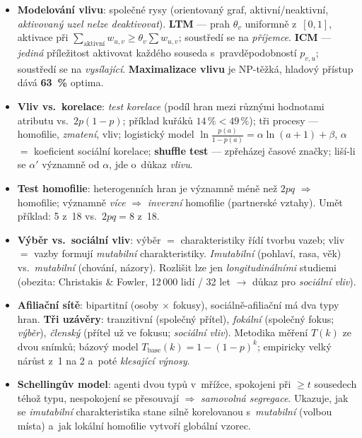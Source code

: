 \documentclass[11pt,a4paper]{article}
\theoremstyle{definition}
\begin{document}
\begin{itemize}
\item \textbf{Modelování vlivu}: společné rysy (orientovaný graf, aktivní/neaktivní,
      \emph{aktivovaný uzel nelze deaktivovat}). \textbf{LTM} --- prah $\theta_v$ uniformně
      z~$[0,1]$, aktivace při $\sum_{\text{aktivní}}w_{u,v}\ge\theta_v\sum w_{u,v}$; soustředí
      se na \emph{příjemce}. \textbf{ICM} --- \emph{jediná} příležitost aktivovat každého
      souseda s~pravděpodobností $p_{v,u}$; soustředí se na \emph{vysílající}.
      \textbf{Maximalizace vlivu} je NP-těžká, hladový přístup dává \textbf{63~\%} optima.
\item \textbf{Vliv vs.\ korelace}: \emph{test korelace} (podíl hran mezi různými hodnotami
      atributu vs.\ $2p(1-p)$; příklad kuřáků $14\,\%<49\,\%$); tři procesy --- homofilie,
      \emph{zmatení}, vliv; logistický model $\ln\frac{p(a)}{1-p(a)}=\alpha\ln(a+1)+\beta$,
      $\alpha$ $=$ koeficient sociální korelace; \textbf{shuffle test} --- zpřeházej časové
      značky; liší-li se $\alpha'$ významně od $\alpha$, jde o~důkaz \emph{vlivu}.
\item \textbf{Test homofilie}: heterogenních hran je významně méně než $2pq$ $\Rightarrow$
      homofilie; významně \emph{více} $\Rightarrow$ \emph{inverzní} homofilie (partnerské
      vztahy). Umět příklad: 5 z~18 vs.\ $2pq=8$ z~18.
\item \textbf{Výběr vs.\ sociální vliv}: výběr $=$ charakteristiky řídí tvorbu vazeb; vliv $=$
      vazby formují \emph{mutabilní} charakteristiky. \emph{Imutabilní} (pohlaví, rasa, věk)
      vs.\ \emph{mutabilní} (chování, názory). Rozlišit lze jen \emph{longitudinálními}
      studiemi (obezita: Christakis \& Fowler, 12\,000 lidí / 32 let $\to$ důkaz pro
      \emph{sociální vliv}).
\item \textbf{Afiliační sítě}: bipartitní (osoby $\times$ fokusy), sociálně-afiliační má dva
      typy hran. \textbf{Tři uzávěry}: tranzitivní (společný přítel), \emph{fokální} (společný
      fokus; \emph{výběr}), \emph{členský} (přítel už ve fokusu; \emph{sociální vliv}).
      Metodika měření $T(k)$ ze dvou snímků; bázový model $T_{\text{base}}(k)=1-(1-p)^k$;
      empiricky velký nárůst z~1 na 2 a~poté \emph{klesající výnosy}.
\item \textbf{Schellingův model}: agenti dvou typů v~mřížce, spokojeni při $\ge t$ sousedech
      téhož typu, nespokojení se přesouvají $\Rightarrow$ \emph{samovolná segregace}. Ukazuje,
      jak se \emph{imutabilní} charakteristika stane silně korelovanou s~\emph{mutabilní}
      (volbou místa) a~jak lokální homofilie vytvoří globální vzorec.

\end{itemize}
\end{document}

